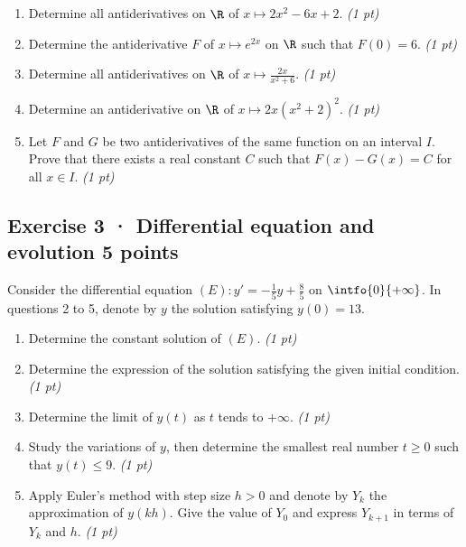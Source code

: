 \begin{enumerate}

\item Determine all antiderivatives on $\R$ of $x\mapsto 2x^2-6x+2$. \hfill\textit{(1 pt)}

\item Determine the antiderivative $F$ of $x\mapsto e^{2x}$ on $\R$ such that $F(0)=6$. \hfill\textit{(1 pt)}

\item Determine all antiderivatives on $\R$ of $x\mapsto\frac{2x}{x^2+6}$. \hfill\textit{(1 pt)}

\item Determine an antiderivative on $\R$ of $x\mapsto2x(x^2+2)^{2}$. \hfill\textit{(1 pt)}

\item Let $F$ and $G$ be two antiderivatives of the same function on an interval $I$. Prove that there exists a real constant $C$ such that $F(x)-G(x)=C$ for all $x\in I$. \hfill\textit{(1 pt)}

\end{enumerate}

\mxnewpage{}

\subsection*{Exercise 3 · Differential equation and evolution \hfill 5 points}Consider the differential equation $(E):y'=-\frac1{5}y+\frac{8}{5}$ on $\intfo{0}{+\infty}$. In questions 2 to 5, denote by $y$ the solution satisfying $y(0)=13$.

\begin{enumerate}

\item Determine the constant solution of $(E)$. \hfill\textit{(1 pt)}

\item Determine the expression of the solution satisfying the given initial condition. \hfill\textit{(1 pt)}

\item Determine the limit of $y(t)$ as $t$ tends to $+\infty$. \hfill\textit{(1 pt)}

\item Study the variations of $y$, then determine the smallest real number $t\ge0$ such that $y(t)\le9$. \hfill\textit{(1 pt)}

\item Apply Euler's method with step size $h>0$ and denote by $Y_k$ the approximation of $y(kh)$. Give the value of $Y_0$ and express $Y_{k+1}$ in terms of $Y_k$ and $h$. \hfill\textit{(1 pt)}

\end{enumerate}

